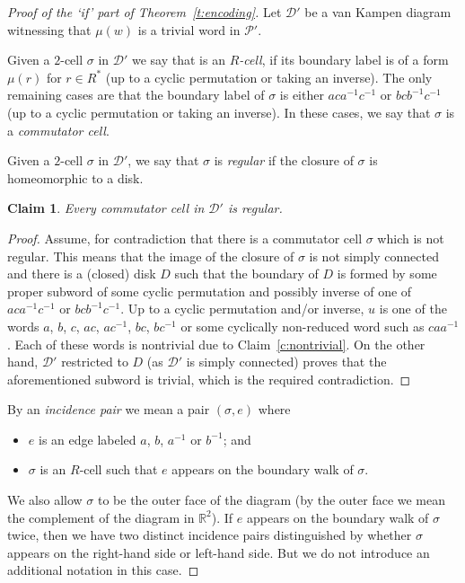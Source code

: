 \documentclass[10pt,a4paper]{article}
\newtheorem{claim}{Claim}[theorem]
\theoremstyle{definition}
\theoremstyle{remark}
\newcommand{\R}{{\mathbb{R}}}
\newcommand\DD{\mathcal{D}}
\newcommand\PP{\mathcal{P}}
\begin{document}
\begin{proof}[Proof of the `if' part of Theorem~\ref{t:encoding}]
  Let $\DD'$ be a
  van Kampen diagram witnessing that $\mu(w)$ is a trivial word in $\PP'$.

  Given a $2$-cell $\sigma$ in $\DD'$ we say that is an \emph{$R$-cell}, if its
  boundary label is of a form $\mu(r)$ for $r \in R^*$ (up to a cyclic
  permutation or taking an inverse). The only remaining cases are that the
  boundary label of $\sigma$ is either $aca^{-1}c^{-1}$ or $bcb^{-1}c^{-1}$ (up
  to a cyclic permutation or taking an inverse). In these cases, we say that
  $\sigma$ is a \emph{commutator cell}.

 Given a $2$-cell $\sigma$ in $\DD'$, we say that $\sigma$ is \emph{regular} if
  the closure of $\sigma$ is homeomorphic to a disk.


\begin{claim}
\label{c:regular}
  Every commutator cell in $\DD'$ is regular.
\end{claim}

\begin{proof}
Assume, for contradiction that there is a commutator cell $\sigma$ which is not
regular. This
    means that the image of the closure of $\sigma$ is not simply connected and
    there is a (closed) disk $D$ such that the boundary of $D$ is formed by
    some proper subword
    of some cyclic permutation and possibly inverse of one of $aca^{-1}c^{-1}$ or
    $bcb^{-1}c^{-1}$. Up to a cyclic permutation and/or inverse,
    $u$ is one of the words $a$, $b$, $c$, $ac$, $ac^{-1}$, $bc$, $bc^{-1}$ or some
    cyclically non-reduced word such as $caa^{-1}$. Each of these words is
    nontrivial due to Claim~\ref{c:nontrivial}. On the other hand, $\DD'$
    restricted to $D$ (as $\DD'$ is simply connected) 
    proves that the aforementioned subword is trivial, which is the required
    contradiction.
\end{proof}





By an \emph{incidence pair} we mean a pair $(\sigma, e)$ where 
\begin{itemize}
 \item  $e$ is an edge labeled $a$, $b$, $a^{-1}$ or $b^{-1}$; and
 \item $\sigma$ is an $R$-cell such that
  $e$ appears on the boundary walk of $\sigma$. 
\end{itemize}
		We also allow $\sigma$ to be
  the outer face of the diagram (by the outer face we mean the complement of
  the diagram in $\R^2$). If $e$ appears on the boundary walk of $\sigma$
  twice, then we have two distinct incidence pairs distinguished by whether
  $\sigma$ appears on the right-hand side or left-hand side. But we do not
  introduce an additional notation in this case.


\end{proof}
\end{document}
